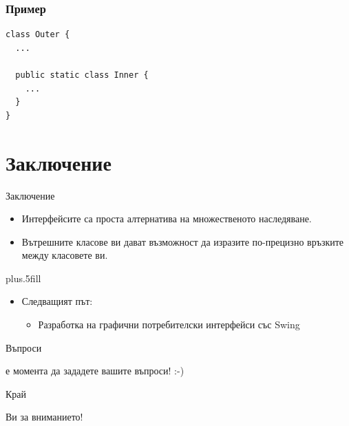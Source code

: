 \documentclass{beamer}
\begin{document}
\begin{frame}[fragile]
  \frametitle{Пример}
  \transdissolve
\begin{lstlisting}
class Outer {
  ...

  public static class Inner {
    ...
  }
}  
\end{lstlisting}
\end{frame}

\section*{Заключение}
\begin{frame}{Заключение}
  \transdissolve
  \begin{itemize}
  \item
    Интерфейсите са проста алтернатива на множественото наследяване.
  \item
    Вътрешните класове ви дават възможност да изразите по-прецизно
    връзките между класовете ви.
  \end{itemize}
  
  \vskip0pt plus.5fill
  \begin{itemize}
  \item
    Следващият път:
    \begin{itemize}
    \item
      Разработка на графични потребителски интерфейси със Swing
    \end{itemize}
  \end{itemize}
\end{frame}

\begin{frame}{Въпроси}
  \transdissolve
  \begin{center}
     е момента да зададете вашите въпроси! :-)
  \end{center}
\end{frame}

\begin{frame}{Край}
  \transdissolve
  \begin{center}
     Ви за вниманието!
  \end{center}
\end{frame}
\end{document}
